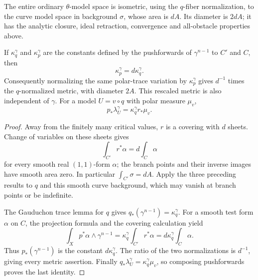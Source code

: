 \begin{proposition}\label{curve-backgrounds647:finite-factor}
The entire ordinary $\theta$-model space is isometric, using the
$q$-fiber normalization, to the curve model space in background
$\sigma$, whose area is $dA$. Its diameter is $2dA$; it has the
analytic closure, ideal retraction, convergence and all-obstacle
properties above.

If $\kappa_q^\gamma$ and $\kappa_p^\gamma$ are the constants
defined by the pushforwards of $\gamma^{n-1}$ to $C'$ and $C$,
then
\[
 \kappa_p^\gamma=d\kappa_q^\gamma.
\]
Consequently normalizing the same polar-trace variation by
$\kappa_p^\gamma$ gives $d^{-1}$ times the $q$-normalized metric,
with diameter $2A$. This rescaled metric is also independent of
$\gamma$. For a model $U=v\circ q$ with polar measure $\mu_v$,
\[
 p_*\lambda_U^\gamma=\kappa_q^\gamma r_*\mu_v.
\]
\end{proposition}
\begin{proof}
Away from the finitely many critical values, $r$ is a covering
with $d$ sheets. Change of variables on these sheets gives
\[
 \int_{C'}r^*\alpha=d\int_C\alpha
\]
for every smooth real $(1,1)$-form $\alpha$; the branch points
and their inverse images have smooth area zero. In particular
$\int_{C'}\sigma=dA$. Apply the three preceding results to $q$
and this smooth curve background, which may vanish at branch
points or be indefinite.

The Gauduchon trace lemma for $q$ gives
$q_*(\gamma^{n-1})=\kappa_q^\gamma$. For a smooth test form
$\alpha$ on $C$, the projection formula and the covering
calculation yield
\[
 \int_Xp^*\alpha\wedge\gamma^{n-1}
  =\kappa_q^\gamma\int_{C'}r^*\alpha
  =d\kappa_q^\gamma\int_C\alpha.
\]
Thus $p_*(\gamma^{n-1})$ is the constant $d\kappa_q^\gamma$.
The ratio of the two normalizations is $d^{-1}$, giving every
metric assertion. Finally
$q_*\lambda_U^\gamma=\kappa_q^\gamma\mu_v$, so composing
pushforwards proves the last identity.
\end{proof}

